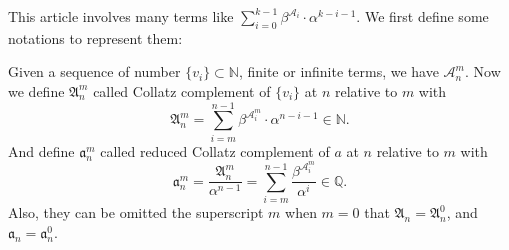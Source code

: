 This article involves many terms like $\textstyle \sum_{i = 0}^{k - 1}\beta^{\mathcal{A}_i}\cdot \alpha^{k-i-1}$. We first define some notations to represent them:
\begin{definition}\label{definition:collatz-complement}
    Given a sequence of number $\{v_{i}\}\subset\mathbb{N}$, finite or infinite terms, we have $\mathcal{A}_{n}^{m}$. Now we define $\mathfrak{A}_n^{m}$ called Collatz complement of $\{v_{i}\}$ at $n$ relative to $m$ with
    \[ \mathfrak{A}_n^{m} = \sum_{i = m}^{n - 1}\beta^{\mathcal{A}_i^{m}}\cdot\alpha^{n-i-1} \in \mathbb{N}. \]
    And define $\mathfrak{a}_n^{m}$ called reduced Collatz complement of $a$ at $n$ relative to $m$ with
    \[ \mathfrak{a}_n^{m} = \frac{\mathfrak{A}_n^{m}}{\alpha^{n-1}} = \sum_{i = m}^{n - 1}\frac{\beta^{\mathcal{A}_i^{m}}}{\alpha^{i}} \in \mathbb{Q}. \]
    Also, they can be omitted the superscript $m$ when $m = 0$ that $\mathfrak{A}_n = \mathfrak{A}_n^{0}$, and $\mathfrak{a}_n = \mathfrak{a}_n^{0}$.
\end{definition}

